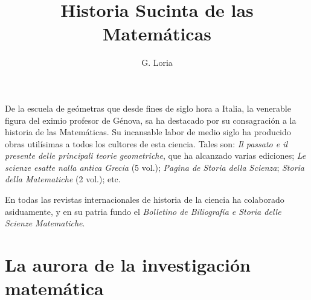 \documentclass[a4paper, 12pt, draft]{article}
\title{Historia Sucinta de las Matemáticas}
\author{G. Loria}
\date{}
\begin{document}
\begin{tcolorbox}[colback=blue!5!white,colframe=blue!75!black]

\vspace{-1.8cm}
\textbf \maketitle

\end{tcolorbox}

\bigskip

\tableofcontents

\newpage

De la escuela de geómetras que desde fines de siglo hora a Italia, la venerable figura del eximio profesor de Génova, sa ha destacado por su consagración a la historia de las Matemáticas. Su incansable labor de medio siglo ha producido obras utilísimas a todos los cultores de esta ciencia. Tales son: \textit{ Il passato e il presente delle principali teorie geometriche}, que ha alcanzado varias ediciones; \textit{ Le scienze esatte nalla antica Grecia} (5 vol.); \textit{ Pagina de Storia della Scienza}; \textit{ Storia della Matematiche} (2 vol.); etc.

En todas las revistas internacionales de historia de la ciencia ha colaborado asiduamente, y en su patria fundo el \textit{ Bolletino de Biliografía e Storia delle Scienze Matematiche}.
\thispagestyle{empty}
\newpage

\setcounter{page}{1}

\section*{La aurora de la investigación matemática}
\end{document}
